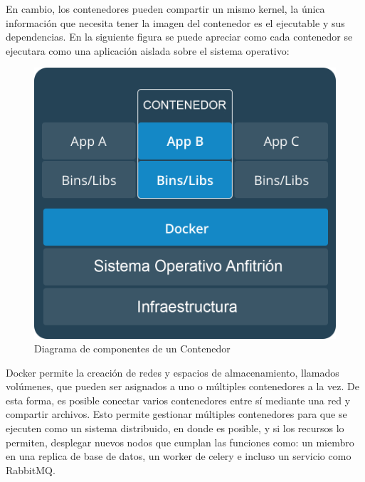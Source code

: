 En cambio, los contenedores pueden compartir un mismo kernel, la única información que necesita tener la imagen del contenedor es el
ejecutable y sus dependencias. En la siguiente figura se puede apreciar como cada contenedor se ejecutara como una aplicación aislada
sobre el sistema operativo:

\begin{figure}[H]
	\centering
		\includegraphics[width=.9\textwidth]{figures/docker_container}
	\caption{Diagrama de componentes de un Contenedor}
	\label{fig:docker_container}
\end{figure}

Docker permite la creación de redes y espacios de almacenamiento, llamados volúmenes, que pueden ser asignados a uno o múltiples
contenedores a la vez. De esta forma, es posible conectar varios contenedores entre sí mediante una red y compartir archivos.
Esto permite gestionar múltiples contenedores para que se ejecuten como un sistema distribuido, en donde es posible, y si los recursos
lo permiten, desplegar nuevos nodos que cumplan las funciones como: un miembro en una replica de base de datos, un worker de celery e
incluso un servicio como RabbitMQ.
